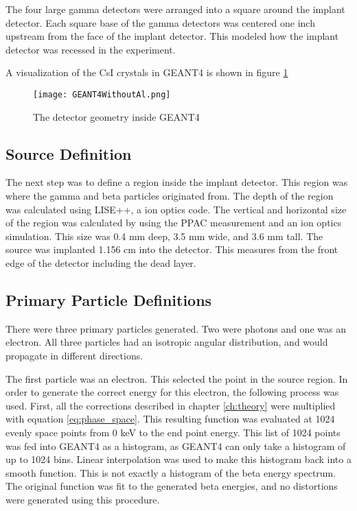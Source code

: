 \documentclass[../main.tex]{subfiles}
\begin{document}
The four large gamma detectors were arranged into a square around the implant detector.
Each square base of the gamma detectors was centered one inch upstream from the face of the implant detector.
This modeled how the implant detector was recessed in the experiment.

A visualization of the CsI crystals in GEANT4 is shown in figure \ref{fig:GEANT4Det}

\begin{figure}[!htb]
	\centerline{\texttt{[image: GEANT4WithoutAl.png]}}
	\caption{The detector geometry inside GEANT4}
	\label{fig:GEANT4Det}
\end{figure}

\subsection{Source Definition}
The next step was to define a region inside the implant detector.
This region was where the gamma and beta particles originated from.
The depth of the region was calculated using LISE++, a ion optics code.
The vertical and horizontal size of the region was calculated by using the PPAC measurement and an ion optics simulation.
This size was 0.4 mm deep, 3.5 mm wide, and 3.6 mm tall.
The source was implanted 1.156 cm into the detector.
This measures from the front edge of the detector including the dead layer.

\subsection{Primary Particle Definitions}
There were three primary particles generated.
Two were photons and one was an electron.
All three particles had an isotropic angular distribution, and would propagate in different directions.

The first particle was an electron. 
This selected the point in the source region.
In order to generate the correct energy for this electron, the following process was used.
First, all the corrections described in chapter \ref{ch:theory} were multiplied with equation \ref{eq:phase_space}.
This resulting function was evaluated at 1024 evenly space points from 0 keV to the end point energy.
This list of 1024 points was fed into GEANT4 as a histogram, as GEANT4 can only take a histogram of up to 1024 bins. 
Linear interpolation was used to make this histogram back into a smooth function.
This is not exactly a histogram of the beta energy spectrum.
The original function was fit to the generated beta energies, and no distortions were generated using this procedure.
\end{document}
